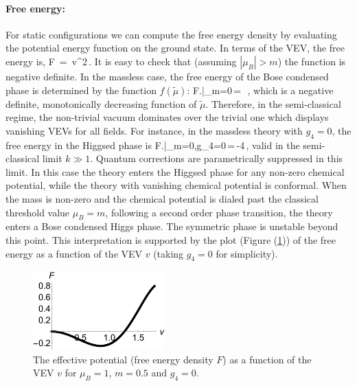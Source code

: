  \paragraph{Free energy:} For static configurations  we can compute the free energy density by evaluating the potential energy function on the ground state.   In terms of the VEV, the free energy is,
 \be
F \,=\, v^2\,.
 \ee
 It is easy to check that (assuming $|\mu_B| > m$) the function is negative definite.
 In the massless case, the free energy of the Bose condensed phase is determined by the function $f(\tilde\mu)$:
 \be
 F\left.\right|_{m=0}\,=\, \,,
 \ee
 which is a negative definite, monotonically decreasing function of $\tilde\mu$. Therefore, in the semi-classical regime, the non-trivial vacuum dominates over the trivial one which displays vanishing VEVs for all fields. For instance, in the massless theory with $g_4=0$, the free energy in the Higgsed phase is
 \be
 F\left.\right|_{m=0,g_4=0}\,=\,-4\,,
 \ee
  valid in the semi-classical limit $k\gg 1$. Quantum corrections are parametrically suppressed in this limit. In this case the theory enters the Higgsed phase for any non-zero chemical potential, while the theory with vanishing chemical potential is conformal.   When the mass is non-zero and the chemical potential is dialed past the classical threshold value $\mu_B=m$, following a second order phase transition, the theory enters a Bose condensed Higgs phase.   The symmetric phase is unstable beyond this point. This interpretation is supported by the plot (Figure (\ref{fvsv})) of the free energy as a function of the VEV $v$ (taking $g_4=0$ for simplicity). 
   \begin{figure}[h]
\begin{center}
\includegraphics[width=2in]{Chapter_3_Folder_1806.06976/figures/Fvsv.pdf}
\end{center}
       \caption[This figure shows the effective potential (free energy density) as a function of the VEV $v$ for $\mu_B=1$, $m=0.5$ and $g_4=0$.
       ]{ The effective potential (free energy density $F$) as a function of the VEV $v$ for $\mu_B=1$, $m=0.5$ and $g_4=0$.
}
\label{fvsv}
\end{figure}

